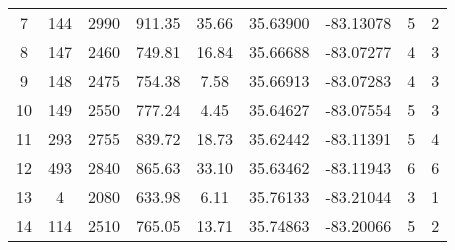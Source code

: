 \begin{table}[p]
\begin{tabular}{ccccccccc}
7   & 144                                                 & 2990                                                          & 911.35                                                       & 35.66 & 35.63900 & -83.13078 & 5                                                                                      & 2 \\ 
8   & 147                                                 & 2460                                                          & 749.81                                                       & 16.84 & 35.66688 & -83.07277 & 4                                                                                      & 3 \\ 
9   & 148                                                 & 2475                                                          & 754.38                                                       & 7.58   & 35.66913 & -83.07283 & 4                                                                                      & 3 \\ 
10 & 149                                                 & 2550                                                          & 777.24                                                       & 4.45   & 35.64627 & -83.07554 & 5                                                                                      & 3 \\ 
11 & 293                                                 & 2755                                                          & 839.72                                                       & 18.73 & 35.62442 & -83.11391 & 5                                                                                      & 4 \\ 
12 & 493                                                 & 2840                                                          & 865.63                                                       & 33.10 & 35.63462 & -83.11943 & 6                                                                                      & 6 \\ 
13 & 4                                                     & 2080                                                          & 633.98                                                       & 6.11   & 35.76133 & -83.21044 & 3                                                                                      & 1 \\ 
14 & 114                                                 & 2510                                                          & 765.05                                                       & 13.71 & 35.74863 & -83.20066 & 5                                                                                      & 2 \\ 

\end{tabular}
\end{table}
